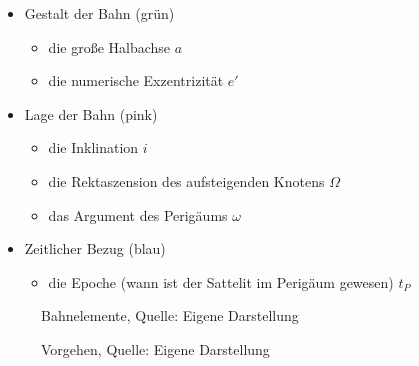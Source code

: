 \begin{itemize}
	\item Gestalt der Bahn (grün)
	\begin{itemize}
		\item die große Halbachse \ensuremath{a}
		\item die numerische Exzentrizität \ensuremath{e'}
	\end{itemize}
	\item Lage der Bahn (pink)
	\begin{itemize}
		\item die Inklination \ensuremath{i}
		\item die Rektaszension des aufsteigenden Knotens \ensuremath{\Omega}
		\item das Argument des Perigäums \ensuremath{\omega}
	\end{itemize}
	\item Zeitlicher Bezug (blau)
	\begin{itemize}
		\item die Epoche (wann ist der Sattelit im Perigäum gewesen) \ensuremath{t_P}
	\end{itemize}
\end{itemize} 
\begin{figure}[h]
	\centering
	\caption[Bahnelemente]{Bahnelemente, Quelle: Eigene Darstellung}              
	\label{fig:bahnelemente_ueb_ii} 
\end{figure}
\begin{figure}[h]
	\centering
	\caption[Vorgehen]{Vorgehen, Quelle: Eigene Darstellung}              
	\label{fig:bahnelemente_ueb_i} 
\end{figure}
